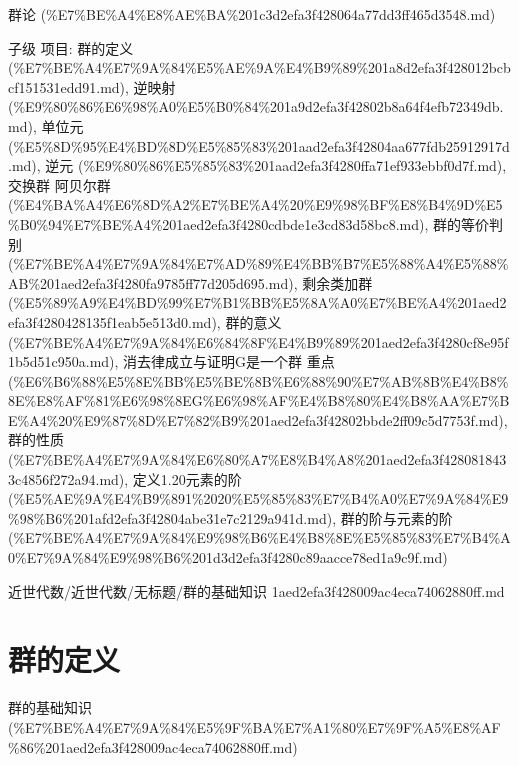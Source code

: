 \begin{note}[来源上级主题]

群论 (\%E7\%BE\%A4\%E8\%AE\%BA\%201c3d2efa3f428064a77dd3ff465d3548.md)

\end{note}

\begin{note}[群的基础知识]

子级 项目: 群的定义 (\%E7\%BE\%A4\%E7\%9A\%84\%E5\%AE\%9A\%E4\%B9\%89\%201a8d2efa3f428012bcbcf151531edd91.md), 逆映射 (\%E9\%80\%86\%E6\%98\%A0\%E5\%B0\%84\%201a9d2efa3f42802b8a64f4efb72349db.md), 单位元 (\%E5\%8D\%95\%E4\%BD\%8D\%E5\%85\%83\%201aad2efa3f42804aa677fdb25912917d.md), 逆元 (\%E9\%80\%86\%E5\%85\%83\%201aad2efa3f4280ffa71ef933ebbf0d7f.md), 交换群 阿贝尔群 (\%E4\%BA\%A4\%E6\%8D\%A2\%E7\%BE\%A4\%20\%E9\%98\%BF\%E8\%B4\%9D\%E5\%B0\%94\%E7\%BE\%A4\%201aed2efa3f4280cdbde1e3cd83d58bc8.md), 群的等价判别 (\%E7\%BE\%A4\%E7\%9A\%84\%E7\%AD\%89\%E4\%BB\%B7\%E5\%88\%A4\%E5\%88\%AB\%201aed2efa3f4280fa9785ff77d205d695.md), 剩余类加群 (\%E5\%89\%A9\%E4\%BD\%99\%E7\%B1\%BB\%E5\%8A\%A0\%E7\%BE\%A4\%201aed2efa3f4280428135f1eab5e513d0.md), 群的意义 (\%E7\%BE\%A4\%E7\%9A\%84\%E6\%84\%8F\%E4\%B9\%89\%201aed2efa3f4280cf8e95f1b5d51c950a.md), 消去律成立与证明G是一个群 重点 (\%E6\%B6\%88\%E5\%8E\%BB\%E5\%BE\%8B\%E6\%88\%90\%E7\%AB\%8B\%E4\%B8\%8E\%E8\%AF\%81\%E6\%98\%8EG\%E6\%98\%AF\%E4\%B8\%80\%E4\%B8\%AA\%E7\%BE\%A4\%20\%E9\%87\%8D\%E7\%82\%B9\%201aed2efa3f42802bbde2ff09c5d7753f.md), 群的性质 (\%E7\%BE\%A4\%E7\%9A\%84\%E6\%80\%A7\%E8\%B4\%A8\%201aed2efa3f4280818433c4856f272a94.md), 定义1.20元素的阶 (\%E5\%AE\%9A\%E4\%B9\%891\%2020\%E5\%85\%83\%E7\%B4\%A0\%E7\%9A\%84\%E9\%98\%B6\%201afd2efa3f42804abe31e7c2129a941d.md), 群的阶与元素的阶 (\%E7\%BE\%A4\%E7\%9A\%84\%E9\%98\%B6\%E4\%B8\%8E\%E5\%85\%83\%E7\%B4\%A0\%E7\%9A\%84\%E9\%98\%B6\%201d3d2efa3f4280c89aacce78ed1a9c9f.md)

\end{note}

\begin{note}[来源路径]

近世代数/近世代数/无标题/群的基础知识 1aed2efa3f428009ac4eca74062880ff.md

\end{note}

\section*{群的定义}

\begin{note}[来源上级主题]

群的基础知识 (\%E7\%BE\%A4\%E7\%9A\%84\%E5\%9F\%BA\%E7\%A1\%80\%E7\%9F\%A5\%E8\%AF\%86\%201aed2efa3f428009ac4eca74062880ff.md)

\end{note}

